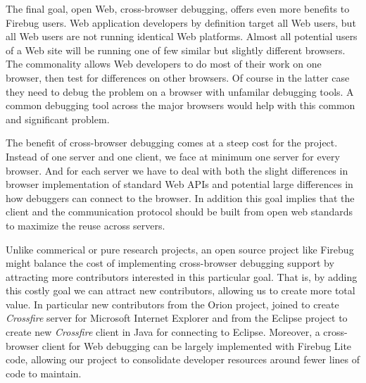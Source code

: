 The final goal, open Web, cross-browser debugging, offers even more benefits to
Firebug users.  Web application developers by definition target all Web users,
but all Web users are not running identical Web platforms. Almost all
potential users of a Web site will be running one of few similar but slightly
different browsers. The commonality allows Web developers to do most of their
work on one browser, then test for differences on other browsers. Of course in 
the latter case they need to debug the problem on a browser with unfamilar debugging
tools. A common debugging tool across the major browsers would help with this
common and significant problem.

The benefit of cross-browser debugging comes at a steep cost for the project.
Instead of one server and one client, we face at minimum one server for every
browser. And for each server we have to deal with both the slight differences in
browser implementation of standard Web APIs and potential large differences in
how debuggers can connect to the browser. In addition this goal implies that the
client and the communication protocol should be built from open web standards to
maximize the reuse across servers.

Unlike commerical or pure research projects, an open source project like Firebug 
might balance the cost of
implementing cross-browser debugging support by attracting more contributors
interested in this particular goal. That is, by adding this costly goal we can
attract new contributors, allowing us to create more total value. In particular
new contributors from the Orion project\cite{orion}, joined to create
\textit{Crossfire} server for Microsoft Internet Explorer and from the Eclipse
project\cite{EclipseJSDT} to create new \textit{Crossfire} client in Java for
connecting to Eclipse.   Moreover, a cross-browser client for Web debugging can be largely
implemented with Firebug Lite code, allowing our project to consolidate 
developer resources around fewer lines of code to maintain.

